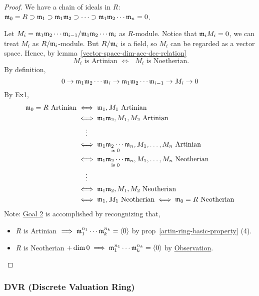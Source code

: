 \begin{proof}
  We have a chain of ideals in $R$:
  $\mathfrak{m}_0 = R \supset \mathfrak{m}_1 \supset \mathfrak{m}_1\mathfrak{m}_2 \supset \dots \supset
  \mathfrak{m}_1\mathfrak{m}_2\dotsm\mathfrak{m}_n = 0$.

  Let $M_i = {\mathfrak{m}_1\mathfrak{m}_2\dotsm\mathfrak{m}_{i-1}}/{\mathfrak{m}_1\mathfrak{m}_2\dotsm\mathfrak{m}_i}$
  as $R$-module.
  Notice that $\mathfrak{m}_i M_i = 0$, we can treat $M_i$ as ${R}/{\mathfrak{m}_i}$-module.
  But ${R}/{\mathfrak{m}_i}$ is a field, so $M_i$ can be regarded as a vector
  space. Hence, by lemma~\ref{vector-space-dim-acc-dcc-relation}
  \[ 
  \text{ $M_i$ is Artinian $\iff$ $M_i$ is Noetherian. } 
  \]
  By definition, 
  $$
  0 \to \mathfrak{m}_1\mathfrak{m}_2\dotsm\mathfrak{m}_i \to \mathfrak{m}_1\mathfrak{m}_2\dotsm\mathfrak{m}_{i-1}
  \to M_i \to 0
  $$
  By Ex1,
  $$
    \begin{aligned}
      \mathfrak{m}_0 = R \text{ Artinian} & \iff \mathfrak{m}_1 , M_1 \text{ Artinian} \\
      & \iff \mathfrak{m}_1 \mathfrak{m}_2 , M_1, M_2 \text{ Artinian} \\
      & \hspace{13pt} \vdots \\
      & \iff \underset{\text{is } 0}{\mathfrak{m}_1 \mathfrak{m}_2 \cdots \mathfrak{m}_n}, M_1, 
      \dots, M_n \text{ Artinian} \\
      & \iff \underset{\text{is } 0}{\mathfrak{m}_1 \mathfrak{m}_2 \cdots \mathfrak{m}_n}, M_1, 
      \dots, M_n \text{ Neotherian} \\
      & \hspace{13pt} \vdots \\
      & \iff \mathfrak{m}_1 \mathfrak{m}_2 , M_1, M_2 \text{ Neotherian} \\
      & \iff \mathfrak{m}_1 , M_1 \text{ Neotherian} \iff \mathfrak{m}_0 = R \text{ Neotherian}
    \end{aligned}
  $$
  Note: \underline{Goal 2} is accomplished by recongnizing that,
  \begin{itemize}
    \item $R$ is Artinian $\implies \mathfrak{m}_1^{n_1}\cdots \mathfrak{m}_k^{n_k} = \langle0\rangle$
      by prop~\ref{artin-ring-basic-property} (4).
  \item $R$ is Neotherian $+ \dim 0 \implies \mathfrak{m}_1^{n_1} \cdots \mathfrak{m}_k^{n_k} = \langle0\rangle$ by \underline{Observation}.
  \end{itemize}
\end{proof}


\subsubsection{DVR (Discrete Valuation Ring)}

